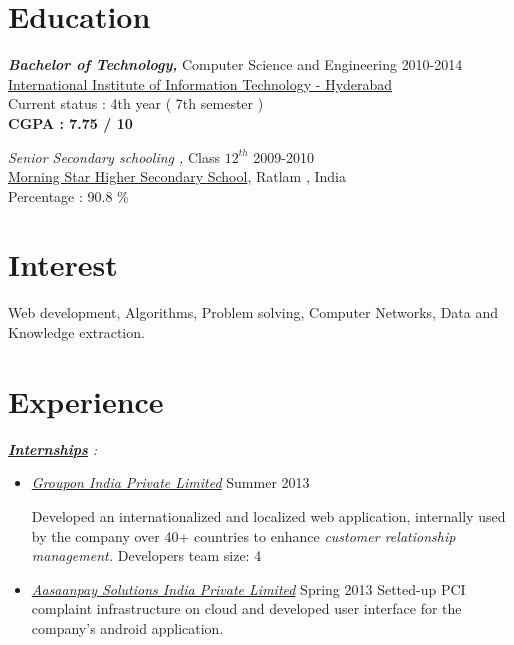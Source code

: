 \documentclass[margin]{res}
\begin{document}
\begin{resume}
 
\section{Education} {\sl \bf Bachelor of Technology,} Computer Science and Engineering    \hfill{2010-2014}\\
		  \hypersetup{urlcolor=black}          
          \href{http://www.iiit.ac.in/}{International Institute of Information Technology - Hyderabad} \\
		  \hypersetup{urlcolor=blue}
          Current status : 4th year ( 7th semester ) \\
          {\bf CGPA : 7.75 / 10}
                 
          {\sl Senior Secondary schooling ,} Class ${12}^{th}$   \hfill{2009-2010} \\
		  \hypersetup{urlcolor=black}          
          \href{http://www.morningstarratlam.com/home_morningstarschool.htm}{Morning Star Higher Secondary School}, Ratlam , India \\
          \hypersetup{urlcolor=blue}
          Percentage : 90.8 \% 


\section{Interest} { Web development, Algorithms, Problem solving, Computer Networks, Data and Knowledge extraction. }


\section{Experience}
{\sl \underline{\bf Internships} : }
\begin{itemize}
\item
 \hypersetup{urlcolor=black}
 {\it \href{http://www.linkedin.com/company/groupon-india}{Groupon India Private Limited}} \hfill{Summer 2013} \\
 \hypersetup{urlcolor=blue}

 Developed an internationalized and localized web application, internally used by the company over 40+ countries to enhance {\it customer relationship management.} \hfill{Developers team size: 4} 
\item
\hypersetup{urlcolor=black}
{\it \href{http://www.linkedin.com/company/3049433}{Aasaanpay Solutions India Private Limited}}  \hfill{Spring 2013}
\hypersetup{urlcolor=blue}
 Setted-up PCI complaint infrastructure on cloud and developed user interface for the company's android application.   
\end{itemize} 


\end{resume}
\end{document}

